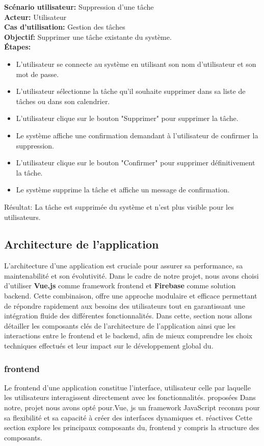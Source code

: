 \documentclass[a4paper,12pt]{report}
\begin{document}
\textbf{Scénario utilisateur:} Suppression d'une tâche\\
\textbf{Acteur:} Utilisateur\\
\textbf{Cas d'utilisation:} Gestion des tâches\\
\textbf{Objectif:} Supprimer une tâche existante du système.\\
\textbf{Étapes:}
\begin{itemize}
    \item L'utilisateur se connecte au système en utilisant son nom d'utilisateur et son mot de passe.
    \item L'utilisateur sélectionne la tâche qu'il souhaite supprimer dans sa liste de tâches ou dans son calendrier.
    \item L'utilisateur clique sur le bouton "Supprimer" pour supprimer la tâche.
    \item Le système affiche une confirmation demandant à l'utilisateur de confirmer la suppression.
    \item L'utilisateur clique sur le bouton "Confirmer" pour supprimer définitivement la tâche.
    \item Le système supprime la tâche et affiche un message de confirmation.
\end{itemize}
Résultat:
    La tâche est supprimée du système et n'est plus visible pour les utilisateurs.

\subsection{Architecture de l'application}
L'architecture d'une application est cruciale pour assurer sa performance, sa maintenabilité et son évolutivité. Dans le cadre de notre projet, nous avons choisi d'utiliser \textbf{Vue.js} comme framework frontend et \textbf{Firebase} comme solution backend. Cette combinaison, offre une approche modulaire et efficace permettant de répondre rapidement aux besoins des utilisateurs tout en garantissant une intégration fluide des différentes fonctionnalités. Dans cette, section nous allons détailler les composants clés de l'architecture de l'application ainsi que les interactions entre le frontend et le backend, afin de mieux comprendre les choix techniques effectués et leur impact sur le développement global du.

\subsubsection{frontend}
Le frontend d'une application constitue l'interface, utilisateur celle par laquelle les utilisateurs interagissent directement avec les fonctionnalités. proposées Dans notre, projet nous avons opté pour.Vue, js un framework JavaScript reconnu pour sa flexibilité et sa capacité à créer des interfaces dynamiques et. réactives Cette section explore les principaux composants du, frontend y compris la structure des
composants.
\end{document}
